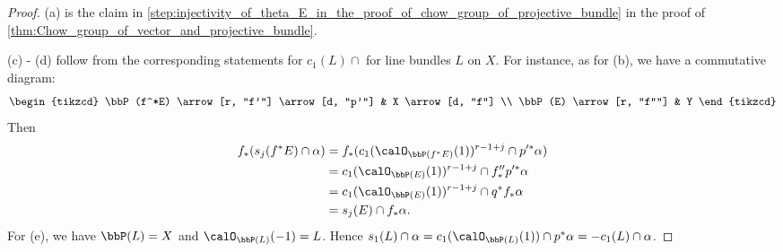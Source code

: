   \begin{proof}
    (a) is the claim in \cref{step:injectivity_of_theta_E_in_the_proof_of_chow_group_of_projective_bundle} in the proof of \cref{thm:Chow_group_of_vector_and_projective_bundle}.
    
    (c) - (d) follow from the corresponding statements for $c_1(L) \cap$ for line bundles $L$ on $X$.
    For instance, as for (b), we have a commutative diagram:
    \[\begin{tikzcd}
      \bbP(f^*E) \arrow[r, "f'"] \arrow[d, "p'"] & X \arrow[d, "f"] \\
      \bbP(E) \arrow[r, "f''"] & Y
    \end{tikzcd}\]
    Then 
    \begin{align*}
      f_*( s_j(f^*E) \cap \alpha ) & = f_*( c_1(\calO_{\bbP(f^*E)}(1))^{r-1+j} \cap p'^*\alpha ) \\
      & = c_1(\calO_{\bbP(E)}(1))^{r-1+j} \cap f''_*p'^*\alpha \\
      & = c_1(\calO_{\bbP(E)}(1))^{r-1+j} \cap q^*f_*\alpha \\
      & = s_j(E) \cap f_*\alpha.
    \end{align*}
    For (e), we have $\bbP(L) = X$ and $\calO_{\bbP(L)}(-1) = L$.
    Hence $s_1(L) \cap \alpha = c_1(\calO_{\bbP(L)}(1)) \cap p^*\alpha = -c_1(L) \cap \alpha$.
  \end{proof}
